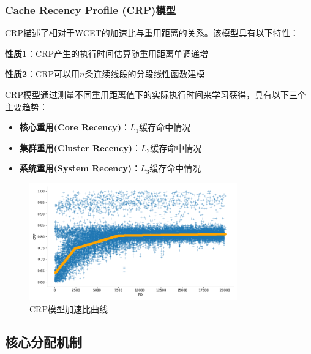\subsubsection{Cache Recency Profile (CRP)模型}

CRP描述了相对于WCET的加速比与重用距离的关系。\cite{r6_Miss_Rate_Calculation_of_L2Cache}该模型具有以下特性：

\begin{tcolorbox}[
    colback=orange!10!white,
    colframe=orange!50!black,
    title=\textbf{CRP模型核心性质},
    fonttitle=\bfseries,
    arc=3pt
]
\textbf{性质1}：CRP产生的执行时间估算随重用距离单调递增

\textbf{性质2}：CRP可以用$n$条连续线段的分段线性函数建模
\end{tcolorbox}

CRP模型通过测量不同重用距离值下的实际执行时间来学习获得，具有以下三个主要趋势：

\begin{tcolorbox}[
    colback=cyan!5!white,
    colframe=cyan!50!black,
    arc=3pt,
    left=5pt,
    right=5pt
]
\begin{itemize}    \item \textbf{核心重用(Core Recency)}：$L_1$缓存命中情况
    \item \textbf{集群重用(Cluster Recency)}：$L_2$缓存命中情况  
    \item \textbf{系统重用(System Recency)}：$L_3$缓存命中情况
\end{itemize}
\end{tcolorbox}

\begin{figure}[H]
\centering
\includegraphics[width=0.8\textwidth]{img/CRP_reality_model.png}
\caption{CRP模型加速比曲线}
\label{fig:crp_curve}
\end{figure}

\subsection{核心分配机制}

